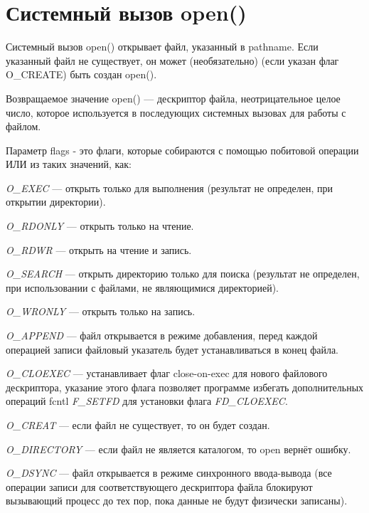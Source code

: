 
\section{Системный вызов open()}

Системный вызов open() открывает файл, указанный в pathname. Если указанный файл не существует, он может (необязательно) (если указан флаг O\_CREATE) быть создан open().


Возвращаемое значение open() --- дескриптор файла, неотрицательное целое число, которое используется в последующих системных вызовах для работы с файлом.

Параметр flags - это флаги, которые собираются с помощью побитовой операции ИЛИ из таких значений, как:

\textit{O\_EXEC} — открыть только для выполнения (результат не определен, при открытии директории).

\textit{O\_RDONLY} — открыть только на чтение.

\textit{O\_RDWR} — открыть на чтение и запись.

\textit{O\_SEARCH} — открыть директорию только для поиска (результат не определен, при использовании с файлами, не являющимися директорией).

\textit{O\_WRONLY} — открыть только на запись.

\textit{O\_APPEND} — файл открывается в режиме добавления, перед каждой операцией записи файловый указатель будет устанавливаться в конец файла.

\textit{O\_CLOEXEC} — устанавливает флаг close-on-exec для нового файлового дескриптора, указание этого флага позволяет программе избегать дополнительных операций fcntl \textit{F\_SETFD} для установки флага \textit{FD\_CLOEXEC}.

\textit{O\_CREAT} — если файл не существует, то он будет создан.

\textit{O\_DIRECTORY} — если файл не является каталогом, то open вернёт ошибку.

\textit{O\_DSYNC} — файл открывается в режиме синхронного ввода-вывода (все операции записи для соответствующего дескриптора файла блокируют вызывающий процесс до тех пор, пока данные не будут физически записаны).

